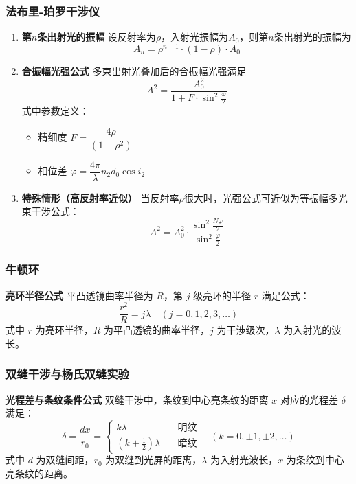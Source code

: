 \documentclass{article}
\begin{document}
	\subsubsection{法布里-珀罗干涉仪}
	\begin{enumerate}[label=\arabic*., leftmargin=2em]
		\item \textbf{第$n$条出射光的振幅}
		设反射率为$\rho$，入射光振幅为$A_0$，则第$n$条出射光的振幅为
		\[
		A_n = \rho^{n-1} \cdot (1-\rho) \cdot A_0
		\]
		
		\item \textbf{合振幅光强公式}
		多束出射光叠加后的合振幅光强满足
		\[
		A^2=\frac{A_0^2}{1+F\cdot\sin^2\frac{\varphi}{2}}
		\]
		式中参数定义：
		\begin{itemize}[leftmargin=2em]
			\item 精细度 $F=\dfrac{4\rho}{(1-\rho^2)}$
			\\
			\item 相位差 $\varphi=\dfrac{4\pi}{\lambda}  n_2 d_0 \cos i_2$
		\end{itemize}
		
		\item \textbf{特殊情形（高反射率近似）}
		当反射率$\rho$很大时，光强公式可近似为等振幅多光束干涉公式：
		\[
		A^2 = A_0^2 \cdot \frac{\sin^2\frac{N\varphi}{2}}{\sin^2\frac{\varphi}{2}}
		\]
	\end{enumerate}
	
	\subsubsection{牛顿环}
	\textbf{亮环半径公式}
	平凸透镜曲率半径为 $R$，第 $j$ 级亮环的半径 $r$ 满足公式：
	\[
	\frac{r^2}{R}=j\lambda \quad (j=0,1,2,3,\dots)
	\]
	式中 $r$ 为亮环半径，$R$ 为平凸透镜的曲率半径，$j$ 为干涉级次，$\lambda$ 为入射光的波长。
	
	\subsubsection{双缝干涉与杨氏双缝实验}
	\textbf{光程差与条纹条件公式}
	双缝干涉中，条纹到中心亮条纹的距离 $x$ 对应的光程差 $\delta$ 满足：
	\[
	\delta = \frac{dx}{r_0}=
	\begin{cases}
		k\lambda \quad &\text{明纹} \\
		\left(k+\frac{1}{2}\right)\lambda \quad &\text{暗纹}
	\end{cases}
	\quad (k=0,\pm1,\pm2,\dots)
	\]
	式中 $d$ 为双缝间距，$r_0$ 为双缝到光屏的距离，$\lambda$ 为入射光波长，$x$ 为条纹到中心亮条纹的距离。
	
\end{document}

